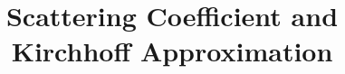\documentclass[12pt]{iopart}
\begin{document}

\def\debproof{\noindent {\bf Proof.} }
\def\finproof{\hfill {\small $\Box$} \\}
\makeatletter %
\makeatother  %
\renewcommand\theequation{{\thesection}.{\arabic{equation}}}

\title[]{Scattering Coefficient and Kirchhoff Approximation}
\author{ }
\address{}



\maketitle

\newcommand{\eps}{\varepsilon}
\newcommand{\RR}{\mathcal{R}}
\newtheorem{lem}{Lemma}[section]
\newtheorem{prop}{Proposition}[section]
\newtheorem{cor}{Corollary}[section]
\newtheorem{thm}{Theorem}[section]
\newtheorem{rem}{Remark}[section]
\newtheorem{alg}{Algorithm}[section]
\newtheorem{assum}{Assumption}[section]
\newtheorem{definition}{Definition}[section]


\newcommand{\MyRoman}[1]{\rm\setcounter{RomanNumber}{#1}\Roman{RomanNumber}}

\newcommand{\bL}{\mathbf{L}}
\newcommand{\bH}{\mathbf{H}}
\newcommand{\bW}{\mathbf{W}}
\newcommand{\bP}{\mathbf{P}}
\newcommand{\bQ}{\mathbf{Q}}
\newcommand{\bp}{\mathbf{p}}
\newcommand{\bq}{\mathbf{q}}
\newcommand{\uL}{u_{_{\rm L}}}
\newcommand{\vL}{v_{_{\rm L}}}
\newcommand{\tuL}{\tilde u_{_{\rm L}}}
\newcommand{\tvL}{\tilde v_{_{\rm L}}}
\newcommand{\fL}{f_{_{\rm L}}}
\newcommand{\gL}{g_{_{\rm L}}}
\newcommand{\bpL}{\bp_{_{\rm L}}}
\newcommand{\bqL}{\bq_{_{\rm L}}}
\newcommand{\tbpL}{\tilde{\bp}_{_{\rm L}}}
\newcommand{\tbqL}{\tilde{\bq}_{_{\rm L}}}
\newcommand{\tbpLf}{\tilde{\bp}_{_{\rm L,1}}}
\newcommand{\tbpLs}{\tilde{\bp}_{_{\rm L,2}}}
\newcommand{\tbqLf}{\tilde{\bq}_{_{\rm L,1}}}
\newcommand{\tbqLs}{\tilde{\bq}_{_{\rm L,2}}}
\newcommand{\bn}{\nu}
\newcommand{\bv}{\mathbf{v}}
\newcommand{\om}{\omega}
\newcommand{\pa}{\partial}
\newcommand{\la}{\langle}
\newcommand{\ra}{\rangle}
\newcommand{\lla}{\la{\hskip -2pt}\la}
\newcommand{\rra}{\ra{\hskip -2pt}\ra}
\newcommand{\jj}{\|{\hskip -0.8pt} |}
\newcommand{\al}{\alpha}
\newcommand{\ze}{\zeta}
\newcommand{\si}{\sigma}
\newcommand{\ep}{\varepsilon}
\newcommand{\na}{\nabla}
\newcommand{\vp}{\varphi}
\newcommand{\ga}{\gamma}
\newcommand{\Ga}{\Gamma}
\newcommand{\Om}{\Omega}
\newcommand{\de}{\delta}
\newcommand{\Th}{\Theta}
\newcommand{\De}{\Delta}
\newcommand{\Lam}{\Lambda}
\newcommand{\lam}{\lambda}
\newcommand{\tri}{\triangle}
\newcommand{\lj}{[{\hskip -2pt} [}
\newcommand{\rj}{]{\hskip -2pt} ]}
\newcommand{\bks}{\backslash}
\newcommand{\diam}{\mathrm{diam}}
\newcommand{\osc}{\mathrm{osc}}
\newcommand{\meas}{\mathrm{meas}}
\newcommand{\dist}{\mathrm{dist}}
\end{document}
